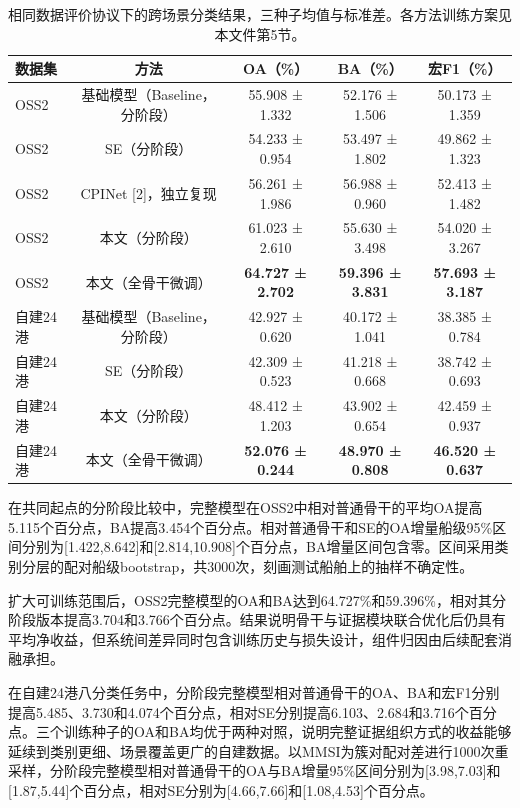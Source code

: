\documentclass[journal,10pt,a4paper]{IEEEtran}
\begin{document}
\begin{table}[!t]
\centering\footnotesize
\setcounter{table}{6}
\caption{相同数据评价协议下的跨场景分类结果，三种子均值与标准差。各方法训练方案见本文件第5节。}
\label{tab:7}
\setlength{\tabcolsep}{3pt}\renewcommand{\arraystretch}{1.2}
\begin{tabularx}{\linewidth}{LCCCC}
\toprule
数据集 & 方法 & OA（\%） & BA（\%） & 宏F1（\%） \\
\midrule
OSS2 & 基础模型（Baseline，分阶段） & 55.908 ± 1.332 & 52.176 ± 1.506 & 50.173 ± 1.359 \\
OSS2 & SE（分阶段） & 54.233 ± 0.954 & 53.497 ± 1.802 & 49.862 ± 1.323 \\
OSS2 & CPINet {[}2{]}，独立复现 & 56.261 ± 1.986 & 56.988 ± 0.960 & 52.413 ± 1.482 \\
OSS2 & 本文（分阶段） & 61.023 ± 2.610 & 55.630 ± 3.498 & 54.020 ± 3.267 \\
OSS2 & 本文（全骨干微调） & \textbf{64.727 ± 2.702} & \textbf{59.396 ± 3.831} & \textbf{57.693 ± 3.187} \\
自建24港 & 基础模型（Baseline，分阶段） & 42.927 ± 0.620 & 40.172 ± 1.041 & 38.385 ± 0.784 \\
自建24港 & SE（分阶段） & 42.309 ± 0.523 & 41.218 ± 0.668 & 38.742 ± 0.693 \\
自建24港 & 本文（分阶段） & 48.412 ± 1.203 & 43.902 ± 0.654 & 42.459 ± 0.937 \\
自建24港 & 本文（全骨干微调） & \textbf{52.076 ± 0.244} & \textbf{48.970 ± 0.808} & \textbf{46.520 ± 0.637} \\
\bottomrule
\end{tabularx}
\end{table}

在共同起点的分阶段比较中，完整模型在OSS2中相对普通骨干的平均OA提高5.115个百分点，BA提高3.454个百分点。相对普通骨干和SE的OA增量船级95\%区间分别为{[}1.422,8.642{]}和{[}2.814,10.908{]}个百分点，BA增量区间包含零。区间采用类别分层的配对船级bootstrap，共3000次，刻画测试船舶上的抽样不确定性。

扩大可训练范围后，OSS2完整模型的OA和BA达到64.727\%和59.396\%，相对其分阶段版本提高3.704和3.766个百分点。结果说明骨干与证据模块联合优化后仍具有平均净收益，但系统间差异同时包含训练历史与损失设计，组件归因由后续配套消融承担。

在自建24港八分类任务中，分阶段完整模型相对普通骨干的OA、BA和宏F1分别提高5.485、3.730和4.074个百分点，相对SE分别提高6.103、2.684和3.716个百分点。三个训练种子的OA和BA均优于两种对照，说明完整证据组织方式的收益能够延续到类别更细、场景覆盖更广的自建数据。以MMSI为簇对配对差进行1000次重采样，分阶段完整模型相对普通骨干的OA与BA增量95\%区间分别为{[}3.98,7.03{]}和{[}1.87,5.44{]}个百分点，相对SE分别为{[}4.66,7.66{]}和{[}1.08,4.53{]}个百分点。
\end{document}
